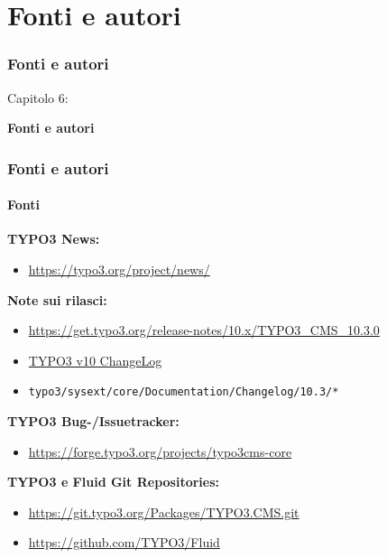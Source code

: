 %

\section{Fonti e autori}
\begin{frame}[fragile]
	\frametitle{Fonti e autori}

	\begin{center}\huge{Capitolo 6:}\end{center}
	\begin{center}\huge{\color{typo3darkgrey}\textbf{Fonti e autori}}\end{center}

\end{frame}


\begin{frame}[fragile]
	\frametitle{Fonti e autori}
	\framesubtitle{Fonti}

	\textbf{TYPO3 News:}
		\begin{itemize}\smaller
			\item \url{https://typo3.org/project/news/}
		\end{itemize}

	\textbf{Note sui rilasci:}
		\begin{itemize}\smaller
			\item \url{https://get.typo3.org/release-notes/10.x/TYPO3_CMS_10.3.0}
			\item \href{https://docs.typo3.org/c/typo3/cms-core/master/en-us/Changelog-10.html}{TYPO3 v10 ChangeLog}
			\item \texttt{typo3/sysext/core/Documentation/Changelog/10.3/*}
		\end{itemize}

	\textbf{TYPO3 Bug-/Issuetracker:}
		\begin{itemize}\smaller
			\item \url{https://forge.typo3.org/projects/typo3cms-core}
		\end{itemize}

	\textbf{TYPO3 e Fluid Git Repositories:}
		\begin{itemize}\smaller
			\item \url{https://git.typo3.org/Packages/TYPO3.CMS.git}
			\item \url{https://github.com/TYPO3/Fluid}
		\end{itemize}

\end{frame}

